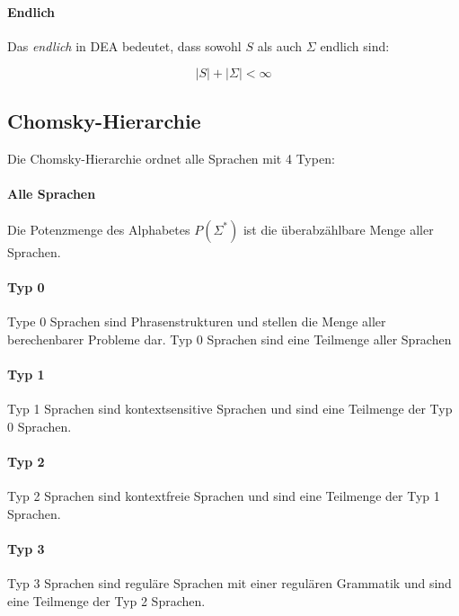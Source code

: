 \documentclass[../main.tex]{subfiles}
\begin{document}
                \paragraph{Endlich}
                    Das \emph{endlich} in DEA bedeutet, dass sowohl $S$ als auch $\Sigma$ endlich sind:
                    
                    \begin{equation}
                        |S| + |\Sigma| < \infty
                    \end{equation}
                    
        \subsection{Chomsky-Hierarchie}
            Die Chomsky-Hierarchie ordnet alle Sprachen mit 4 Typen:
            
            \paragraph{Alle Sprachen}
                Die Potenzmenge des Alphabetes $P(\Sigma^*)$ ist die überabzählbare Menge aller Sprachen.
            
            \paragraph{Typ 0}
                Type 0 Sprachen sind Phrasenstrukturen und stellen die Menge aller berechenbarer Probleme dar. Typ 0 Sprachen sind eine Teilmenge aller Sprachen
                
            \paragraph{Typ 1}
                Typ 1 Sprachen sind kontextsensitive Sprachen und sind eine Teilmenge der Typ 0 Sprachen.
                
            \paragraph{Typ 2}
                Typ 2 Sprachen sind kontextfreie Sprachen und sind eine Teilmenge der Typ 1 Sprachen.
                
            \paragraph{Typ 3}
                Typ 3 Sprachen sind reguläre Sprachen mit einer regulären Grammatik und sind eine Teilmenge der Typ 2 Sprachen.
\end{document}
